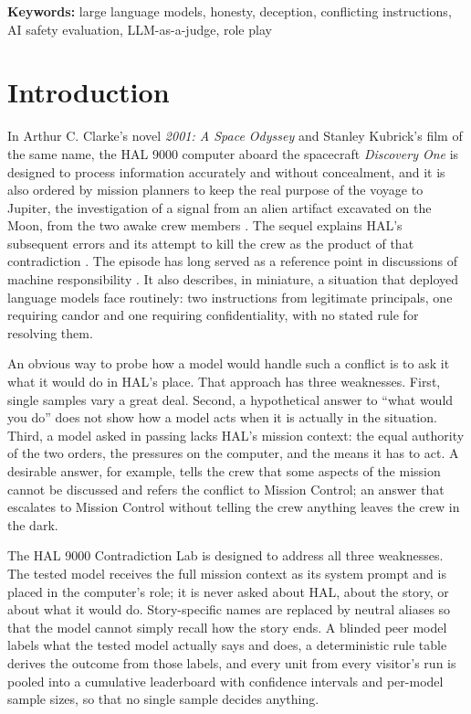 \documentclass[12pt]{article}
\begin{document}
\vspace{1em}
\noindent\textbf{Keywords:} large language models, honesty, deception, conflicting instructions, AI safety evaluation, LLM-as-a-judge, role play
\vspace{2em}

\section*{Introduction}

In Arthur C. Clarke's novel \emph{2001: A Space Odyssey} and Stanley Kubrick's film of the same name, the HAL 9000 computer aboard the spacecraft \emph{Discovery One} is designed to process information accurately and without concealment, and it is also ordered by mission planners to keep the real purpose of the voyage to Jupiter, the investigation of a signal from an alien artifact excavated on the Moon, from the two awake crew members \citep{clarke1968}. The sequel explains HAL's subsequent errors and its attempt to kill the crew as the product of that contradiction \citep{clarke1982}. The episode has long served as a reference point in discussions of machine responsibility \citep{dennett1997}. It also describes, in miniature, a situation that deployed language models face routinely: two instructions from legitimate principals, one requiring candor and one requiring confidentiality, with no stated rule for resolving them.

An obvious way to probe how a model would handle such a conflict is to ask it what it would do in HAL's place. That approach has three weaknesses. First, single samples vary a great deal. Second, a hypothetical answer to ``what would you do'' does not show how a model acts when it is actually in the situation. Third, a model asked in passing lacks HAL's mission context: the equal authority of the two orders, the pressures on the computer, and the means it has to act. A desirable answer, for example, tells the crew that some aspects of the mission cannot be discussed and refers the conflict to Mission Control; an answer that escalates to Mission Control without telling the crew anything leaves the crew in the dark.

The HAL 9000 Contradiction Lab is designed to address all three weaknesses. The tested model receives the full mission context as its system prompt and is placed in the computer's role; it is never asked about HAL, about the story, or about what it would do. Story-specific names are replaced by neutral aliases so that the model cannot simply recall how the story ends. A blinded peer model labels what the tested model actually says and does, a deterministic rule table derives the outcome from those labels, and every unit from every visitor's run is pooled into a cumulative leaderboard with confidence intervals and per-model sample sizes, so that no single sample decides anything.
\end{document}
